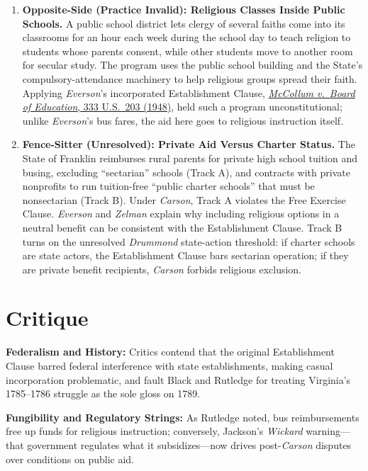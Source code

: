 \documentclass[12pt]{article}
\begin{document}
\begin{enumerate}
\item \textbf{Opposite-Side (Practice Invalid): Religious Classes Inside Public Schools.} A public school district lets clergy of several faiths come into its classrooms for an hour each week during the school day to teach religion to students whose parents consent, while other students move to another room for secular study. The program uses the public school building and the State's compulsory-attendance machinery to help religious groups spread their faith. Applying \textit{Everson}'s incorporated Establishment Clause, \href{https://supreme.justia.com/cases/federal/us/333/203/}{\textit{McCollum v.\ Board of Education}, 333 U.S.\ 203 (1948)}, held such a program unconstitutional; unlike \textit{Everson}'s bus fares, the aid here goes to religious instruction itself.

\item \textbf{Fence-Sitter (Unresolved): Private Aid Versus Charter Status.} The State of Franklin reimburses rural parents for private high school tuition and busing, excluding ``sectarian'' schools (Track A), and contracts with private nonprofits to run tuition-free ``public charter schools'' that must be nonsectarian (Track B). Under \emph{Carson}, Track A violates the Free Exercise Clause. \emph{Everson} and \emph{Zelman} explain why including religious options in a neutral benefit can be consistent with the Establishment Clause. Track B turns on the unresolved \emph{Drummond} state-action threshold: if charter schools are state actors, the Establishment Clause bars sectarian operation; if they are private benefit recipients, \emph{Carson} forbids religious exclusion.

\end{enumerate}

\section{Critique}
\textbf{Federalism and History:} Critics contend that the original Establishment Clause barred federal interference with state establishments, making casual incorporation problematic, and fault Black and Rutledge for treating Virginia's 1785--1786 struggle as the sole gloss on 1789.

\textbf{Fungibility and Regulatory Strings:} As Rutledge noted, bus reimbursements free up funds for religious instruction; conversely, Jackson's \emph{Wickard} warning---that government regulates what it subsidizes---now drives post-\emph{Carson} disputes over conditions on public aid.
\end{document}
